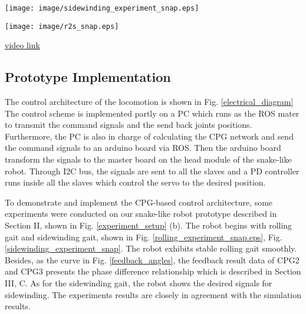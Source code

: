 \documentclass[letterpaper, 10 pt, conference]{ieeeconf}
\begin{document}
\begin{figure*}[thpb]
\centering
\texttt{[image: image/sidewinding\_experiment\_snap.eps]}
\caption{Snapshots of the robot rolling, the CPG parameters: amplitude $\pm30^{\circ}$, frequency $3Hz$, phase difference $pi/2$. See also the link below.}
\label{sidewinding_experiment_snap}
\end{figure*}

\begin{figure*}[thpb]
\centering
\texttt{[image: image/r2s\_snap.eps]}
\caption{Snapshots of the robot rolling, the CPG parameters: amplitude $\pm30^{\circ}$, frequency $3Hz$, phase difference $pi/2$. See also the link below.}
\label{r2s_snap}
\end{figure*}

\href{https://www.youtube.com/channel/UCC-bpOlhM7zSwDCZjVuE2rQ/videos?view=0&shelf_id=0&sort=dd}{video link}

\subsection{Prototype Implementation}

The control architecture of the locomotion is shown in Fig. \ref{electrical_diagram} The control scheme is implemented partly on a PC which runs as the ROS mater to transmit the command signals and the send back joints positions. Furthermore, the PC is also in charge of calculating the CPG network and send the command signals to an arduino board via ROS. Then the arduino board transform the signals to the master board on the head module of the snake-like robot. Through I2C bus, the signals are sent to all the slaves and a PD controller runs inside all the slaves which control the servo to the desired position.

To demonstrate and implement the CPG-based control architecture, some experiments were conducted on our snake-like robot prototype described in Section II, shown in Fig. \ref{experiment_setup} (b). The robot begins with rolling gait and sidewinding gait, shown in Fig. \ref{rolling_experiment_snap.eps}, Fig. \ref{sidewinding_experiment_snap}. The robot exhibits stable rolling gait smoothly. Besides, as the curve in Fig. \ref{feedback_angles}, the feedback result data of CPG2 and CPG3 presents the phase difference relationship which is described in Section III, C.
As for the sidewinding gait, the robot shows the desired signals for sidewinding. The experiments results are closely in agreement with the simulation results.
\end{document}
